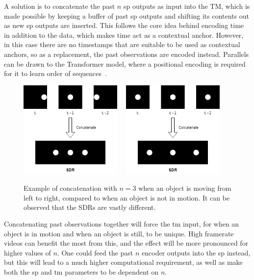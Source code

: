 A solution is to concatenate the past $n$ \gls*{sp} outputs as input into the TM, which is made possible by keeping a buffer of past \gls*{sp} outputs and shifting its contents out as new \gls*{sp} outputs are inserted. This follows the core idea behind encoding time in addition to the data, which makes time act as a contextual anchor. However, in this case there are no timestamps that are suitable to be used as contextual anchors, so as a replacement, the past observations are encoded instead. Parallels can be drawn to the Transformer model, where a positional encoding is required for it to learn order of sequences~\cite{transformer}.
\par
\begin{figure}[H]
    \centering
    \includegraphics[width=0.45\textwidth]{resources/methodology/temporal_concatenation.png}
    \unskip\ \vrule\
    \includegraphics[width=0.45\textwidth]{resources/methodology/temporal_concatenation_still.png}
    \caption{Example of concatenation with $n=3$ when an object is moving from left to right, compared to when an object is not in motion. It can be observed that the SDRs are vastly different.}
\end{figure}
Concatenating past observations together will force the \gls*{tm} input, for when an object is in motion and when an object is still, to be unique. High framerate videos can benefit the most from this, and the effect will be more pronounced for higher values of $n$. One could feed the past $n$ encoder outputs into the \gls*{sp} instead, but this will lead to a much higher computational requirement, as well as make both the \gls*{sp} and \gls*{tm} parameters to be dependent on $n$.

